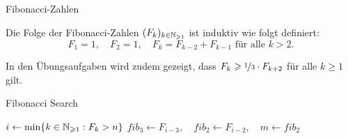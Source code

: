 \begin{frame}{Fibonacci-Zahlen}
\begin{definition}
Die Folge der \alert{Fibonacci-Zahlen} $(F_k)_{k \in \natpos}$ ist induktiv wie folgt definiert:
$$F_1 = 1, \quad F_2 = 1, \quad F_k = F_{k-2} + F_{k-1} \text{ f\"ur alle } k > 2.$$
\end{definition}

\begin{remark}
In den \"Ubungsaufgaben wird zudem gezeigt, dass $F_k \geq \nicefrac{1}{3} \cdot F_{k+2}$ f\"ur alle $k \geq 1$ gilt.
\end{remark}
\end{frame}

\begin{frame}{Fibonacci Search}
\scriptsize
\begin{algorithm}[H]
	\caption{Fibonacci Search}
	\label{search:alg:fibsearch}
	\DontPrintSemicolon
    $i \gets \min \{ k \in \natpos : F_k > n \}$\;
    $fib_3 \gets F_{i-3}, \quad fib_2 \gets F_{i-2}, \quad m \gets fib_2$\;
    \Return{\False}
\end{algorithm}
\end{frame}
